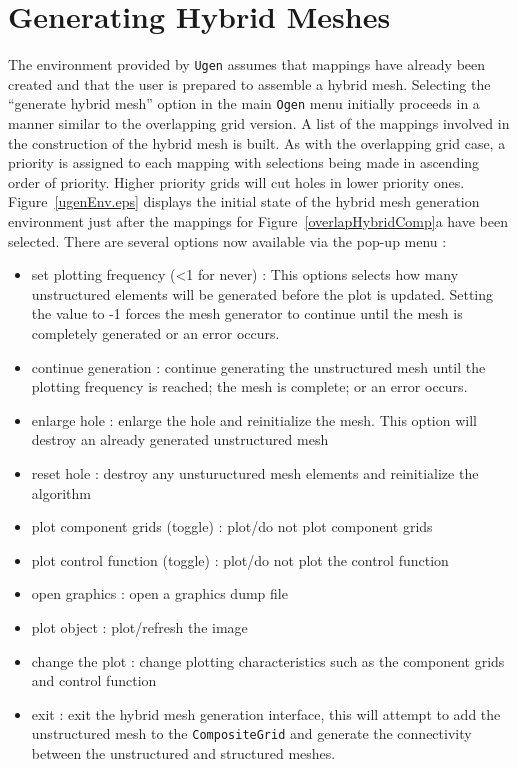 \documentclass{article}
\begin{document}
\section{Generating Hybrid Meshes}
The environment provided by {\tt Ugen} assumes that mappings have already been created and
that the user is prepared to assemble a hybrid mesh.  Selecting the ``generate hybrid mesh'' option
in the main {\tt Ogen} menu initially proceeds in a manner similar to the overlapping grid version.
A list of the mappings involved in the construction of the hybrid mesh is built.  As with the
overlapping grid case, a priority is assigned to each mapping with selections being made in 
ascending order of priority.  Higher priority grids will cut holes in lower priority ones.
Figure~\ref{ugenEnv.eps} displays the initial state of the hybrid mesh generation environment
just after the mappings for Figure~\ref{overlapHybridComp}a have been selected.  There are several
options now available via the pop-up menu :\\
\begin{itemize}
\item set plotting frequency (<1 for never) : This options selects how many unstructured elements will be generated before the plot is updated. Setting the value to -1 forces the mesh generator to continue until the mesh is completely generated or an error occurs.
\item continue generation : continue generating the unstructured mesh until the plotting frequency is reached; the mesh is complete; or an error occurs.
\item enlarge hole : enlarge the hole and reinitialize the mesh.  This option will destroy an already generated unstructured mesh
\item reset hole : destroy any unstuructured mesh elements and reinitialize the algorithm
\item plot component grids (toggle) : plot/do not plot component grids
\item plot control function (toggle) : plot/do not plot the control function
\item open graphics : open a graphics dump file
\item plot object : plot/refresh the image
\item change the plot : change plotting characteristics such as the component grids and control function
\item exit : exit the hybrid mesh generation interface, this will attempt to add the unstructured mesh to the {\tt CompositeGrid} and generate the connectivity between the unstructured and structured meshes.
\end{itemize}
\end{document}
